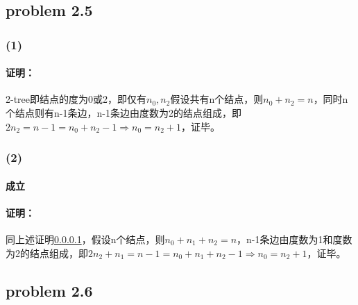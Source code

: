 \documentclass[11pt]{ctexart}
\begin{document}
	\subsection*{problem 2.5}
	\subsubsection*{(1)}
	\paragraph{证明：}\label{2.5.1}
	2-tree即结点的度为0或2，即仅有$n_0,n_2$假设共有n个结点，则$n_0+n_2=n$，同时n个结点则有n-1条边，n-1条边由度数为2的结点组成，即$2n_2=n-1=n_0+n_2-1\Rightarrow n_0=n_2+1$，证毕。
	\subsubsection*{(2)}
	\paragraph{成立}
	\paragraph{证明：}
	同上述证明\ref{2.5.1}，假设n个结点，则$n_0+n_1+n_2=n$，n-1条边由度数为1和度数为2的结点组成，即$2n_2+n_1=n-1=n_0+n_1+n_2-1\Rightarrow n_0=n_2+1$，证毕。
	\subsection*{problem 2.6}
\end{document}
